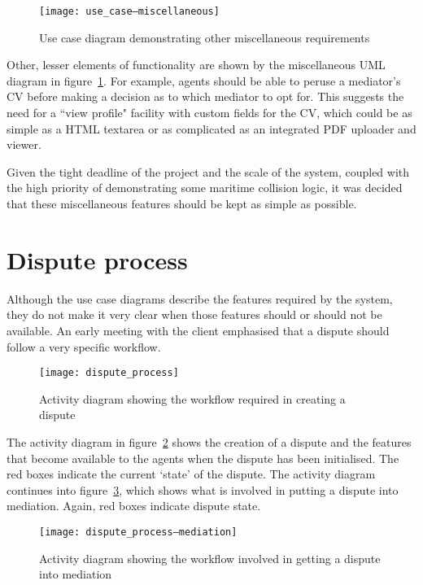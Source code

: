 \begin{figure}[h!]
  \centering
    \ifimages
    \texttt{[image: use\_case--miscellaneous]}
    \fi
  \caption{Use case diagram demonstrating other miscellaneous requirements}
  \label{uml:useCase:miscellaneous}
\end{figure}

Other, lesser elements of functionality are shown by the miscellaneous UML diagram in figure~\ref{uml:useCase:miscellaneous}. For example, agents should be able to peruse a mediator's CV before making a decision as to which mediator to opt for. This suggests the need for a ``view profile" facility with custom fields for the CV, which could be as simple as a HTML textarea or as complicated as an integrated PDF uploader and viewer.

Given the tight deadline of the project and the scale of the system, coupled with the high priority of demonstrating some maritime collision logic, it was decided that these miscellaneous features should be kept as simple as possible.

\section{Dispute process}

Although the use case diagrams describe the features required by the system, they do not make it very clear when those features should or should not be available. An early meeting with the client emphasised that a dispute should follow a very specific workflow.

\begin{figure}[h!]
  \centering
    \ifimages
    \texttt{[image: dispute\_process]}
    \fi
  \caption{Activity diagram showing the workflow required in creating a dispute}
  \label{uml:activity:dispute}
\end{figure}

The activity diagram in figure~\ref{uml:activity:dispute} shows the creation of a dispute and the features that become available to the agents when the dispute has been initialised. The red boxes indicate the current `state' of the dispute. The activity diagram continues into figure~\ref{uml:activity:mediation}, which shows what is involved in putting a dispute into mediation. Again, red boxes indicate dispute state.

\begin{figure}[h!]
  \centering
    \ifimages
    \texttt{[image: dispute\_process--mediation]}
    \fi
  \caption{Activity diagram showing the workflow involved in getting a dispute into mediation}
  \label{uml:activity:mediation}
\end{figure}

